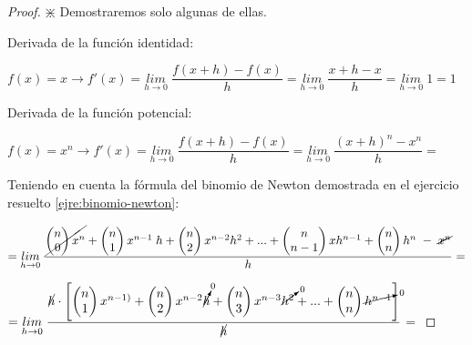 	\begin{proof}   $\divideontimes$ Demostraremos solo algunas de ellas.
	
	Derivada de la función identidad:
	
	$f(x)=x \to f'(x)=\underset{h\to 0}{lim}\;{\dfrac {f(x+h)-f(x)}{h}}=\underset {h \to 0}{lim}\;{\dfrac {x+h-x}{h}}=\underset{h\to 0}{lim}\;{1}=1$
	
	\vspace{4mm}Derivada de la función potencial:
	
	$f(x)=x^n \to f'(x)=\underset {h\to 0}{lim}\;{\dfrac {f(x+h)-f(x)}{h}}=\underset{h\to 0}{lim}\;{\dfrac {(x+h)^n - x^n}{h}}=$
	
	Teniendo en cuenta la fórmula del binomio de Newton demostrada en el ejercicio resuelto \ref{ejre:binomio-newton}:
	
	\noindent \footnotesize{$= \underset {h\to 0}{lim}\;{\dfrac { \cancel{\left( \begin{matrix} n \\ 0 \end{matrix} \right) x^n} + \left( \begin{matrix} n \\ 1 \end{matrix} \right) x^{n-1}\; h + \left( \begin{matrix} n \\ 2 \end{matrix} \right) x^{n-2} h^2 + ... + \left( \begin{matrix} n \\ n-1 \end{matrix} \right) x h^{n-1} + \left( \begin{matrix} n \\ n \end{matrix} \right) h^n \; -\; \cancel{x^n}   }{h}}=$}
	
	\noindent  $=\underset{h\to 0}{lim}\;{\dfrac {\cancel{h}\cdot \left[\left( \begin{matrix} n \\ 1 \end{matrix} \right) x^{n-1)} + \left( \begin{matrix} n \\ 2 \end{matrix} \right) x^{n-2} \cancelto{0}{h} + \left( \begin{matrix} n \\ 3 \end{matrix} \right) x^{n-3}\cancelto{0}{h^2} + ... + \left( \begin{matrix} n \\ n \end{matrix} \right) \cancelto{0}{h^{n-1}}   \right]}{\cancel{h}}} $\normalsize{$=$}
	

\end{proof}
